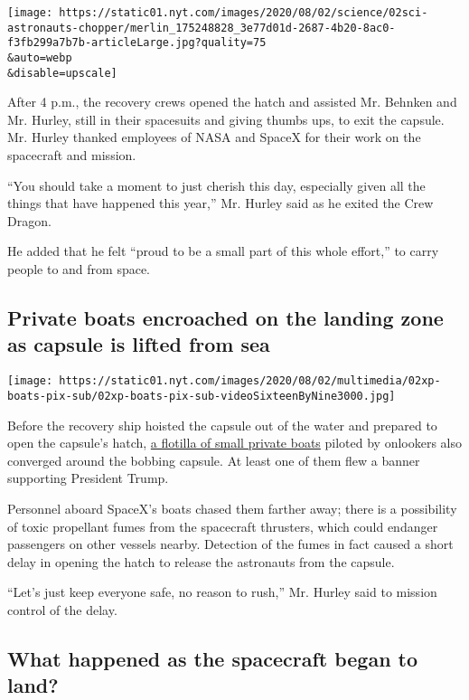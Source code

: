 \texttt{[image: https://static01.nyt.com/images/2020/08/02/science/02sci-astronauts-chopper/merlin\_175248828\_3e77d01d-2687-4b20-8ac0-f3fb299a7b7b-articleLarge.jpg?quality=75\\\&auto=webp\\\&disable=upscale]}

After 4 p.m., the recovery crews opened the hatch and assisted Mr.
Behnken and Mr. Hurley, still in their spacesuits and giving thumbs ups,
to exit the capsule. Mr. Hurley thanked employees of NASA and SpaceX for
their work on the spacecraft and mission.

``You should take a moment to just cherish this day, especially given
all the things that have happened this year,'' Mr. Hurley said as he
exited the Crew Dragon.

He added that he felt ``proud to be a small part of this whole effort,''
to carry people to and from space.

\hypertarget{private-boats-encroached-on-the-landing-zone-as-capsule-is-lifted-from-sea}{%
\subsection{Private boats encroached on the landing zone as capsule is
lifted from
sea}\label{private-boats-encroached-on-the-landing-zone-as-capsule-is-lifted-from-sea}}

\texttt{[image: https://static01.nyt.com/images/2020/08/02/multimedia/02xp-boats-pix-sub/02xp-boats-pix-sub-videoSixteenByNine3000.jpg]}

Before the recovery ship hoisted the capsule out of the water and
prepared to open the capsule's hatch,
\href{https://www.nytimes.com/2020/08/02/us/flag-boat-SpaceX.html}{a
flotilla of small private boats} piloted by onlookers also converged
around the bobbing capsule. At least one of them flew a banner
supporting President Trump.

Personnel aboard SpaceX's boats chased them farther away; there is a
possibility of toxic propellant fumes from the spacecraft thrusters,
which could endanger passengers on other vessels nearby. Detection of
the fumes in fact caused a short delay in opening the hatch to release
the astronauts from the capsule.

``Let's just keep everyone safe, no reason to rush,'' Mr. Hurley said to
mission control of the delay.

\hypertarget{what-happened-as-the-spacecraft-began-to-land}{%
\subsection{What happened as the spacecraft began to
land?}\label{what-happened-as-the-spacecraft-began-to-land}}

